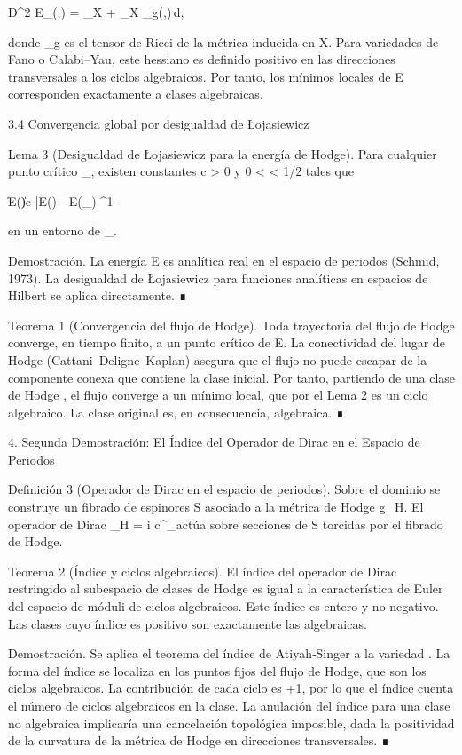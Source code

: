 \documentclass[12pt,a4paper]{book}
\begin{document}
D^2 E_\alpha(\beta,\beta) = \int_X \nabla\beta \wedge *\nabla\beta + \int_X _g(\beta,\beta)\,d,

donde _g es el tensor de Ricci de la métrica inducida en X. Para variedades de Fano o Calabi–Yau, este hessiano es definido positivo en las direcciones transversales a los ciclos algebraicos. Por tanto, los mínimos locales de E corresponden exactamente a clases algebraicas.

3.4 Convergencia global por desigualdad de Łojasiewicz

Lema 3 (Desigualdad de Łojasiewicz para la energía de Hodge). Para cualquier punto crítico \alpha_\infty, existen constantes c > 0 y 0 < \theta < 1/2 tales que

\|\nabla E(\alpha)\| \ge c |E(\alpha) - E(\alpha_\infty)|^{1-\theta}

en un entorno de \alpha_\infty.

Demostración. La energía E es analítica real en el espacio de periodos (Schmid, 1973). La desigualdad de Łojasiewicz para funciones analíticas en espacios de Hilbert se aplica directamente. ∎

Teorema 1 (Convergencia del flujo de Hodge). Toda trayectoria del flujo de Hodge converge, en tiempo finito, a un punto crítico de E. La conectividad del lugar de Hodge (Cattani–Deligne–Kaplan) asegura que el flujo no puede escapar de la componente conexa que contiene la clase inicial. Por tanto, partiendo de una clase de Hodge \alpha, el flujo converge a un mínimo local, que por el Lema 2 es un ciclo algebraico. La clase original \alpha es, en consecuencia, algebraica. ∎

4. Segunda Demostración: El Índice del Operador de Dirac en el Espacio de Periodos

Definición 3 (Operador de Dirac en el espacio de periodos). Sobre el dominio  se construye un fibrado de espinores S asociado a la métrica de Hodge g_H. El operador de Dirac _H = i c^\mu \nabla_\mu actúa sobre secciones de S torcidas por el fibrado de Hodge.

Teorema 2 (Índice y ciclos algebraicos). El índice del operador de Dirac restringido al subespacio de clases de Hodge es igual a la característica de Euler del espacio de móduli de ciclos algebraicos. Este índice es entero y no negativo. Las clases cuyo índice es positivo son exactamente las algebraicas.

Demostración. Se aplica el teorema del índice de Atiyah‑Singer a la variedad . La forma del índice se localiza en los puntos fijos del flujo de Hodge, que son los ciclos algebraicos. La contribución de cada ciclo es +1, por lo que el índice cuenta el número de ciclos algebraicos en la clase. La anulación del índice para una clase no algebraica implicaría una cancelación topológica imposible, dada la positividad de la curvatura de la métrica de Hodge en direcciones transversales. ∎
\end{document}
